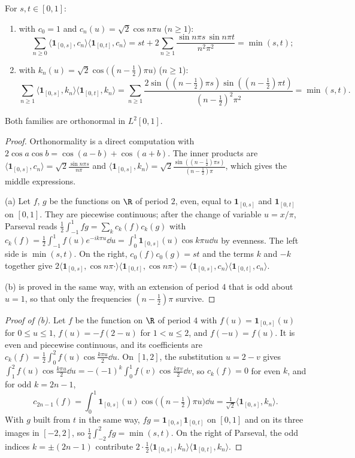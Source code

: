 \begin{lemma}\label{lem:twobases}
For $s,t\in[0,1]$:
\begin{enumerate}[label=(\alph*)]
\item with $c_0=1$ and $c_n(u)=\sqrt2\cos n\pi u$ ($n\ge1$):
\[\sum_{n\ge0}\langle\mathbf 1_{[0,s]},c_n\rangle\langle\mathbf 1_{[0,t]},c_n\rangle=st+2\sum_{n\ge1}\frac{\sin n\pi s\,\sin n\pi t}{n^2\pi^2}=\min(s,t);\]
\item with $k_n(u)=\sqrt2\cos\bigl((n-\frac12)\pi u\bigr)$ ($n\ge1$):
\[\sum_{n\ge1}\langle\mathbf 1_{[0,s]},k_n\rangle\langle\mathbf 1_{[0,t]},k_n\rangle=\sum_{n\ge1}\frac{2\sin((n-\frac12)\pi s)\sin((n-\frac12)\pi t)}{(n-\frac12)^2\pi^2}=\min(s,t).\]
\end{enumerate}
Both families are orthonormal in $L^2[0,1]$.
\end{lemma}

\begin{proof}
Orthonormality is a direct computation with $2\cos a\cos b=\cos(a-b)+\cos(a+b)$. The inner products are $\langle\mathbf 1_{[0,s]},c_n\rangle=\sqrt2\frac{\sin n\pi s}{n\pi}$ and
$\langle\mathbf 1_{[0,s]},k_n\rangle=\sqrt2\frac{\sin((n-\frac12)\pi s)}{(n-\frac12)\pi}$, which gives the middle expressions.

(a) Let $f$, $g$ be the functions on $\R$ of period $2$, even, equal to $\mathbf 1_{[0,s]}$ and $\mathbf 1_{[0,t]}$ on $[0,1]$. They are piecewise continuous; after the change of variable $u=x/\pi$, Parseval reads
$\frac12\int_{-1}^1fg=\sum_kc_k(f)c_k(g)$ with $c_k(f)=\frac12\int_{-1}^1f(u)e^{-ik\pi u}\dd u=\int_0^1\mathbf 1_{[0,s]}(u)\cos k\pi u\dd u$ by evenness. The left side is $\min(s,t)$. On the right, $c_0(f)c_0(g)=st$ and the terms $k$ and $-k$
together give $2\langle\mathbf 1_{[0,s]},\cos n\pi\cdot\rangle\langle\mathbf 1_{[0,t]},\cos n\pi\cdot\rangle=\langle\mathbf 1_{[0,s]},c_n\rangle\langle\mathbf 1_{[0,t]},c_n\rangle$.

(b) is proved in the same way, with an extension of period $4$ that is odd about $u=1$, so that only the frequencies $(n-\frac12)\pi$ survive.
\end{proof}

\begin{proof}[Proof of (b)]
Let $f$ be the function on $\R$ of period $4$ with $f(u)=\mathbf 1_{[0,s]}(u)$ for $0\le u\le1$, $f(u)=-f(2-u)$ for $1<u\le2$, and $f(-u)=f(u)$. It is even and piecewise continuous, and its
coefficients are $c_k(f)=\frac12\int_0^2f(u)\cos\frac{k\pi u}2\dd u$. On $[1,2]$, the substitution $u=2-v$ gives $\int_1^2f(u)\cos\frac{k\pi u}2\dd u=-(-1)^k\int_0^1f(v)\cos\frac{k\pi v}2\dd v$, so
$c_k(f)=0$ for even $k$, and for odd $k=2n-1$,
\[c_{2n-1}(f)=\int_0^1\mathbf 1_{[0,s]}(u)\cos\bigl((n-\tfrac12)\pi u\bigr)\dd u=\tfrac1{\sqrt2}\langle\mathbf 1_{[0,s]},k_n\rangle .\]
With $g$ built from $t$ in the same way, $fg=\mathbf 1_{[0,s]}\mathbf 1_{[0,t]}$ on $[0,1]$ and on its three images in $[-2,2]$, so $\frac14\int_{-2}^2fg=\min(s,t)$. On the right of Parseval, the odd
indices $k=\pm(2n-1)$ contribute $2\cdot\frac12\langle\mathbf 1_{[0,s]},k_n\rangle\langle\mathbf 1_{[0,t]},k_n\rangle$.
\end{proof}

